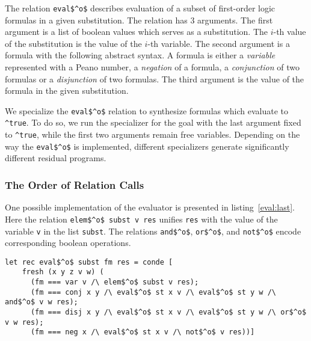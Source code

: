 The relation \lstinline{eval$^o$} describes evaluation of a subset of first-order logic formulas in a given substitution.
The relation has 3 arguments.
The first argument is a list of boolean values which serves as a substitution.
The $i$-th value of the substitution is the value of the $i$-th variable.
The second argument is a formula with the following abstract syntax.
A formula is either a \emph{variable} represented with a Peano number, a \emph{negation} of a formula, a \emph{conjunction} of two formulas or a \emph{disjunction} of two formulas.
The third argument is the value of the formula in the given substitution.

We specialize the \lstinline{eval$^o$} relation to synthesize formulas which evaluate to \lstinline{^true}.
To do so, we run the specializer for the goal with the last argument fixed to \lstinline{^true}, while the first two arguments remain free variables.
Depending on the way the \lstinline{eval$^o$} is implemented, different specializers generate significantly different residual programs.

\subsubsection{The Order of Relation Calls}

One possible implementation of the evaluator is presented in listing~\ref{eval:last}.
Here the relation \lstinline{elem$^o$ subst v res} unifies \lstinline{res} with the value of the variable \lstinline{v} in the list \lstinline{subst}.
The relations \lstinline{and$^o$}, \lstinline{or$^o$}, and \lstinline{not$^o$} encode corresponding boolean operations.

\begin{figure*}[!h]
  \centering
  \begin{minipage}{0.95\textwidth}
    \begin{lstlisting}[label={eval:last}, caption={Evaluator of formulas with boolean operation last}, captionpos=b, frame=tb]
  let rec eval$^o$ subst fm res = conde [
    fresh (x y z v w) (
      (fm === var v /\ elem$^o$ subst v res);
      (fm === conj x y /\ eval$^o$ st x v /\ eval$^o$ st y w /\ and$^o$ v w res);
      (fm === disj x y /\ eval$^o$ st x v /\ eval$^o$ st y w /\ or$^o$ v w res);
      (fm === neg x /\ eval$^o$ st x v /\ not$^o$ v res))]
    \end{lstlisting}
  \end{minipage}
\end{figure*}

